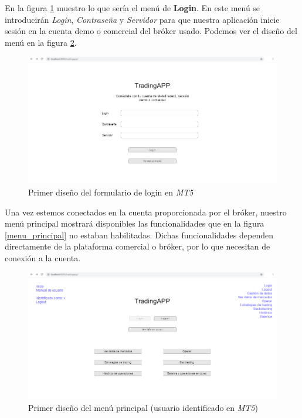 En la figura \ref{login} muestro lo que sería el menú de \textbf{Login}. En este menú se introducirán \textit{Login}, \textit{Contraseña} y \textit{Servidor} para que nuestra aplicación inicie sesión en la cuenta demo o comercial del bróker usado. Podemos ver el diseño del menú en la figura \ref{logued}. \newline

\begin{figure}[h]
	\includegraphics[width=1.2\textwidth]{imagenes/menu_login}
	\caption{Primer diseño del formulario de login en \textit{MT5}} \label{login}
\end{figure}

Una vez estemos conectados en la cuenta proporcionada por el bróker, nuestro menú principal mostrará disponibles las funcionalidades que en la figura \ref{menu_principal} no estaban habilitadas. Dichas funcionalidades dependen directamente de la plataforma comercial o bróker, por lo que necesitan de conexión a la cuenta. \newline

\begin{figure}[h]
	\includegraphics[width=1.2\textwidth]{imagenes/menu_principal_logued.png}
	\caption{Primer diseño del menú principal (usuario identificado en \textit{MT5}) } \label{logued}
\end{figure}



